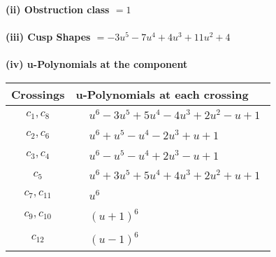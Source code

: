 \documentclass[1p]{elsarticle_modified}
\theoremstyle{definition}
\begin{document}
\flushleft \textbf{(ii) Obstruction class $= 1$}\\~\\
\flushleft \textbf{(iii) Cusp Shapes $= -3 u^5-7 u^4+4 u^3+11 u^2+4$}\\~\\
\newpage\renewcommand{\arraystretch}{1}
\flushleft \textbf{(iv) u-Polynomials at the component}\newline \\
\begin{tabular}{m{50pt}|m{274pt}}
Crossings & \hspace{64pt}u-Polynomials at each crossing \\
\hline $$\begin{aligned}c_{1},c_{8}\end{aligned}$$&$\begin{aligned}
&u^6-3 u^5+5 u^4-4 u^3+2 u^2- u+1
\end{aligned}$\\
\hline $$\begin{aligned}c_{2},c_{6}\end{aligned}$$&$\begin{aligned}
&u^6+u^5- u^4-2 u^3+u+1
\end{aligned}$\\
\hline $$\begin{aligned}c_{3},c_{4}\end{aligned}$$&$\begin{aligned}
&u^6- u^5- u^4+2 u^3- u+1
\end{aligned}$\\
\hline $$\begin{aligned}c_{5}\end{aligned}$$&$\begin{aligned}
&u^6+3 u^5+5 u^4+4 u^3+2 u^2+u+1
\end{aligned}$\\
\hline $$\begin{aligned}c_{7},c_{11}\end{aligned}$$&$\begin{aligned}
&u^6
\end{aligned}$\\
\hline $$\begin{aligned}c_{9},c_{10}\end{aligned}$$&$\begin{aligned}
&(u+1)^6
\end{aligned}$\\
\hline $$\begin{aligned}c_{12}\end{aligned}$$&$\begin{aligned}
&(u-1)^6
\end{aligned}$\\
\hline
\end{tabular}\\~\\
\end{document}

